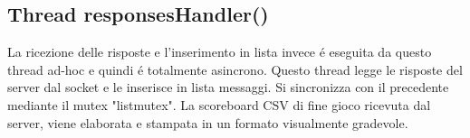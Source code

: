  \subsection{Thread responsesHandler()}
 La ricezione delle risposte e l'inserimento in lista invece \'e eseguita da questo thread ad-hoc e quindi \'e totalmente asincrono. Questo thread legge le risposte del server dal socket e le inserisce in lista messaggi. Si sincronizza con il precedente mediante il mutex "listmutex". La scoreboard CSV di fine gioco ricevuta dal server, viene elaborata e stampata in un formato visualmente gradevole.























